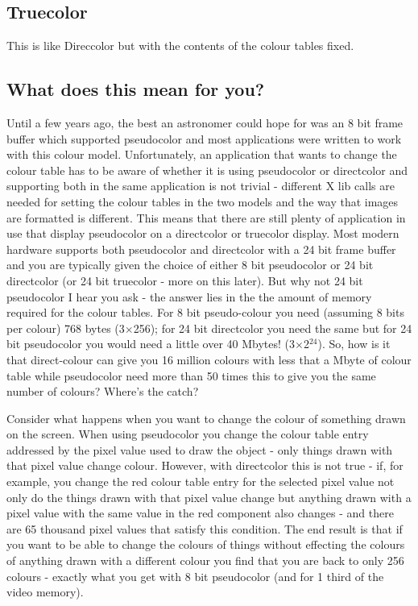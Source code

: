 \documentclass[twoside,11pt]{article}
\newcommand{\xlabel}[1]{}
\begin{document}
\subsection{\xlabel{sc15_true}Truecolor\label{sc15_true}}

This is like Direccolor but with the contents of the colour tables
fixed.

\subsection{\xlabel{sc15_yourdisplay}What does this mean for you?\label{sc15_yourdisplay}}

Until a few years ago, the best an astronomer could hope for was an 8 bit
frame buffer which supported pseudocolor and most applications were
written to work with this colour model. Unfortunately, an application that
wants to change the colour table has to be aware of whether it is using
pseudocolor or directcolor and supporting both in the same application
is not trivial - different X lib calls are needed for setting the colour
tables in the two models and the way that images are formatted is
different. This means that there are still plenty of application in use
that display pseudocolor on a directcolor or truecolor display. 
Most modern hardware supports both pseudocolor and directcolor with a
24 bit frame buffer and you are typically given the choice of either 8 bit
pseudocolor or 24 bit directcolor (or 24 bit truecolor - more on
this later). But why not 24 bit pseudocolor I hear you ask - the answer
lies in the the amount of memory required for the colour tables. For 8 bit
pseudo-colour you need (assuming 8 bits per colour) 768 bytes (3$\times$256); for
24 bit directcolor you need the same but for 24 bit pseudocolor you
would need a little over 40 Mbytes! (3$\times$2$^{24}$). So, how is it that
direct-colour can give you 16 million colours with less that a Mbyte of
colour table while pseudocolor need more than 50 times this to give you
the same number of colours? Where's the catch?

Consider what happens when you want to change the colour of something
drawn on the screen. When using pseudocolor you change the colour table
entry addressed by the pixel value used to draw the object - only things
drawn with that pixel value change colour. However, with directcolor
this is not true - if, for example, you change the red colour table entry
for the selected pixel value not only do the things drawn with that pixel
value change but anything drawn with a pixel value with the same value in
the red component also changes - and there are 65 thousand pixel values
that satisfy this condition. The end result is that if you want to be able
to change the colours of things without effecting the colours of anything
drawn with a different colour you find that you are back to only 256
colours - exactly what you get with 8 bit pseudocolor (and for 1 third
of the video memory). 
\end{document}
